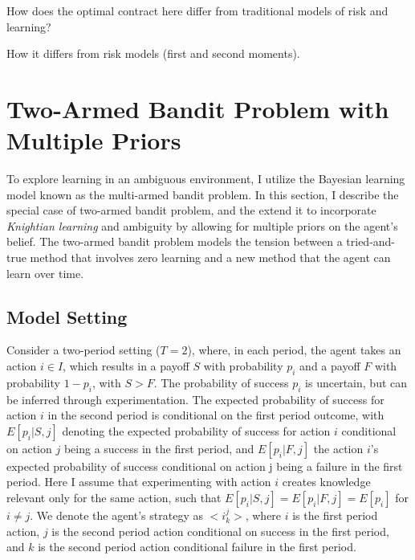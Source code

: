 \documentclass[11pt]{article} %
\theoremstyle{exampstyle}
\begin{document}
How does the optimal contract here differ from traditional models of risk and learning?

How it differs from risk models (first and second moments). 


\section{Two-Armed Bandit Problem with Multiple Priors}
\label{bandit}
To explore learning in an ambiguous environment, I utilize the Bayesian learning model known as the multi-armed bandit problem. In this section, I describe the special case of two-armed bandit problem, and the extend it to incorporate \emph{Knightian learning} and ambiguity by allowing for multiple priors on the agent's belief. The two-armed bandit problem models the tension between a tried-and-true method that involves zero learning and a new method that the agent can learn over time. 

\subsection{Model Setting}

Consider a two-period setting ($T=2$), where, in each period, the agent takes an action $ i \in I$, which results in a payoff $S$ with probability $p_i$ and a payoff $F$ with probability $1-p_i$, with $S>F$. The probability of success $p_i$ is uncertain, but can be inferred through experimentation. The expected probability of success for action $i$ in the second period is conditional on the first period outcome, with $E[p_i | S, j]$ denoting the expected probability of success for action $i$ conditional on action $j$ being a success in the first period, and $E[p_i | F, j]$ the action $i$'s expected probability of success conditional on action j being a failure in the first period. Here I assume that experimenting with action $i$ creates knowledge relevant only for the same action, such that $E[p_i | S, j] = E[p_i | F, j] = E[p_i]$ for $i \neq j$. We denote the agent's strategy as $<\!i^j_k\!>$, where $i$ is the first period action, $j$ is the second period action conditional on success in the first period, and $k$ is the second period action conditional failure in the first period. 
\end{document}
